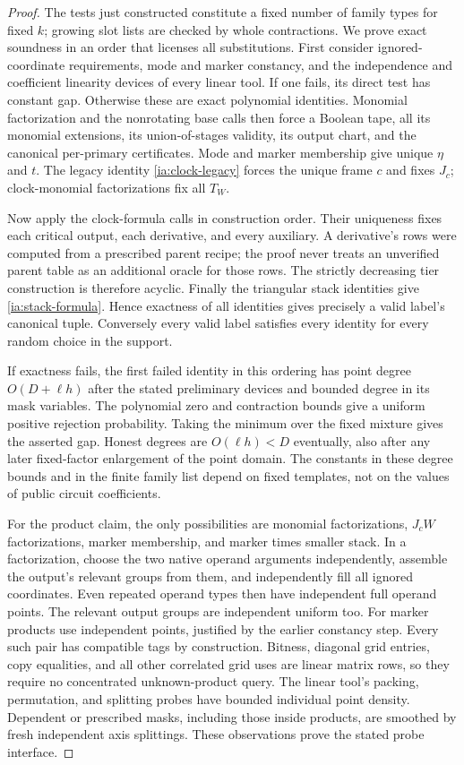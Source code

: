 \begin{proof}
The tests just constructed constitute a fixed number of family
types for fixed $k$; growing slot lists are checked by whole
contractions.  We prove exact soundness in an order that licenses
all substitutions.  First consider ignored-coordinate requirements,
mode and marker constancy, and the independence and coefficient
linearity devices of every linear tool.  If one fails, its direct
test has constant gap.  Otherwise these are exact polynomial
identities.  Monomial factorization and the nonrotating base calls
then force a Boolean tape, all its monomial extensions, its
union-of-stages validity, its output chart, and the canonical
per-primary certificates.  Mode and marker membership give unique
$\eta$ and $t$.  The legacy identity \eqref{ia:clock-legacy}
forces the unique frame $c$ and fixes $J_c$; clock-monomial
factorizations fix all $T_W$.

Now apply the clock-formula calls in construction order.  Their
uniqueness fixes each critical output, each derivative, and every
auxiliary.  A derivative's rows were computed from a prescribed
parent recipe; the proof never treats an unverified parent table
as an additional oracle for those rows.  The strictly decreasing
tier construction is therefore acyclic.  Finally the triangular
stack identities give \eqref{ia:stack-formula}.  Hence exactness
of all identities gives precisely a valid label's canonical tuple.
Conversely every valid label satisfies every identity for every
random choice in the support.

If exactness fails, the first failed identity in this ordering has
point degree $O(D+\ell h)$ after the stated preliminary devices
and bounded degree in its mask variables.  The polynomial zero and
contraction bounds give a uniform positive rejection probability.
Taking the minimum over the fixed mixture gives the asserted gap.
Honest degrees are $O(\ell h)<D$ eventually, also after any later
fixed-factor enlargement of the point domain.  The constants in
these degree bounds and in the finite family list depend on fixed
templates, not on the values of public circuit coefficients.

For the product claim, the only possibilities are monomial
factorizations, $J_cW$ factorizations, marker membership, and marker
times smaller stack.  In a factorization, choose the two native
operand arguments independently, assemble the output's relevant
groups from them, and independently fill all ignored coordinates.
Even repeated operand types then have independent full operand
points.  The relevant output groups are independent uniform too.
For marker products use independent points, justified by the
earlier constancy step.  Every such pair has compatible tags by
construction.  Bitness, diagonal grid entries, copy equalities,
and all other correlated grid uses are linear matrix rows, so they
require no concentrated unknown-product query.  The linear tool's
packing, permutation, and splitting probes have bounded individual
point density.  Dependent or prescribed masks, including those
inside products, are smoothed by fresh independent axis splittings.
These observations prove the stated probe interface.
\end{proof}

